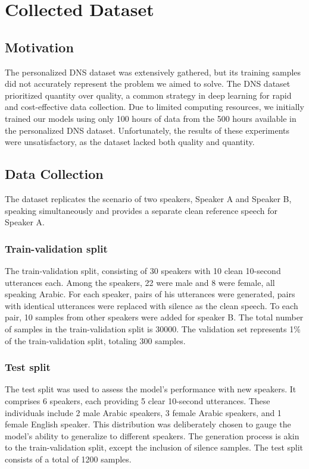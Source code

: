 \section{Collected Dataset}
\subsection{Motivation}
The personalized DNS dataset was extensively gathered, but its training samples did not accurately represent the problem we aimed to solve. The DNS dataset prioritized quantity over quality, a common strategy in deep learning for rapid and cost-effective data collection.
Due to limited computing resources, we initially trained our models using only 100 hours of data from the 500 hours available in the personalized DNS dataset. Unfortunately, the results of these experiments were unsatisfactory, as the dataset lacked both quality and quantity.

\subsection{Data Collection}
The dataset replicates the scenario of two speakers, Speaker A and Speaker B, speaking simultaneously and provides a separate clean reference speech for Speaker A.
\subsubsection{Train-validation split}
The train-validation split, consisting of 30 speakers with 10 clean 10-second utterances each. Among the speakers, 22 were male and 8 were female, all speaking Arabic. 
For each speaker, pairs of his utterances were generated, pairs with identical utterances were replaced with silence as the clean speech. To each pair, 10 samples from other speakers were added for speaker B. 
The total number of samples in the train-validation split is 30000. The validation set represents 1\% of the train-validation split, totaling 300 samples.

\subsubsection{Test split}
The test split was used to assess the model's performance with new speakers. It comprises 6 speakers, each providing 5 clear 10-second utterances. These individuals include 2 male Arabic speakers, 3 female Arabic speakers, and 1 female English speaker. This distribution was deliberately chosen to gauge the model's ability to generalize to different speakers. The generation process is akin to the train-validation split, except the inclusion of silence samples. The test split consists of a total of 1200 samples.